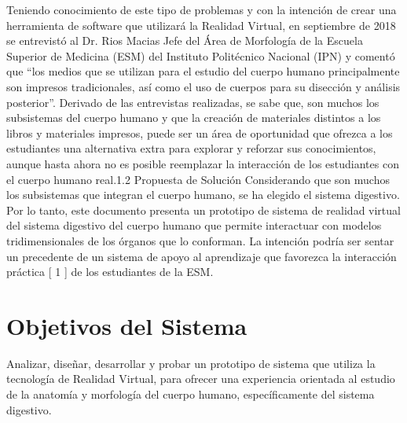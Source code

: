 Teniendo conocimiento de este tipo de problemas y con la intención de crear una herramienta de software que utilizará la Realidad Virtual, en septiembre de 2018 se entrevistó al Dr. Rios Macias Jefe del Área de Morfología de la Escuela Superior de Medicina (ESM) del Instituto Politécnico Nacional (IPN) y comentó que “los medios que se utilizan para el estudio del cuerpo humano principalmente son impresos tradicionales, así como el uso de cuerpos para su disección y análisis posterior”. Derivado de las entrevistas realizadas, se sabe que, son muchos los subsistemas del cuerpo humano y que la creación de materiales distintos a los libros y materiales impresos, puede ser un área de oportunidad que ofrezca a los estudiantes una alternativa extra para explorar y reforzar sus conocimientos, aunque hasta ahora no es posible reemplazar la interacción de los estudiantes con el cuerpo humano real.1.2 Propuesta de Solución
Considerando que son muchos los subsistemas que integran el cuerpo humano, se ha elegido el sistema digestivo. Por lo tanto, este documento presenta un prototipo de sistema de realidad virtual del sistema digestivo del cuerpo humano que permite interactuar con modelos tridimensionales de los órganos que lo conforman. La intención podría ser sentar un precedente de un sistema de apoyo al aprendizaje que favorezca la interacción práctica [ 1 ] de los estudiantes de la ESM.\\

\section{Objetivos del Sistema}
Analizar, diseñar, desarrollar y probar un prototipo de sistema que utiliza la tecnología de Realidad Virtual, para ofrecer una experiencia orientada al estudio 
de la anatomía y morfología del cuerpo humano, específicamente del sistema digestivo.\\

